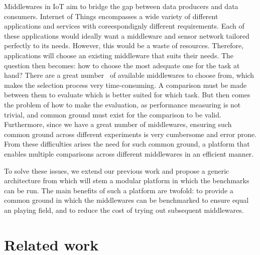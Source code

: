 \documentclass[conference]{IEEEtran}
\begin{document}
Middlewares in IoT aim to bridge the gap between data producers and data consumers. Internet of Things encompasses a wide variety of different applications and services with coreespondignly different requirements. Each of these applications would ideally want a middleware and sensor network tailored perfectly to its needs. However, this would be a waste of resources. Therefore, applications will choose an existing middleware that suits their needs. The question then becomes: how to choose the most adequate one for the task at hand? There are a great number~\cite{razzaque_middleware_2016} of available middlewares to choose from, which makes the selection process very time-consuming. A comparison must be made between them to evaluate which is better suited for which task. But then comes the problem of how to make the evaluation, as performance measuring is not trivial, and common ground must exist for the comparison to be valid. Furthermore, since we have a great number of middlewares, ensuring such common ground across different experiments is very cumbersome and error prone. From these difficulties arises the need for such common ground, a platform that enables multiple comparisons across different middlewares in an efficient manner. 

To solve these issues, we extend our previous work and propose a generic architecture from which will stem a modular platform in which the benchmarks can be run. The main benefits of such a platform are twofold: to provide a common ground in which the middlewares can be benchmarked to ensure equal an playing field, and to reduce the cost of trying out subsequent middlewares.  


\section{Related work}
\end{document}
